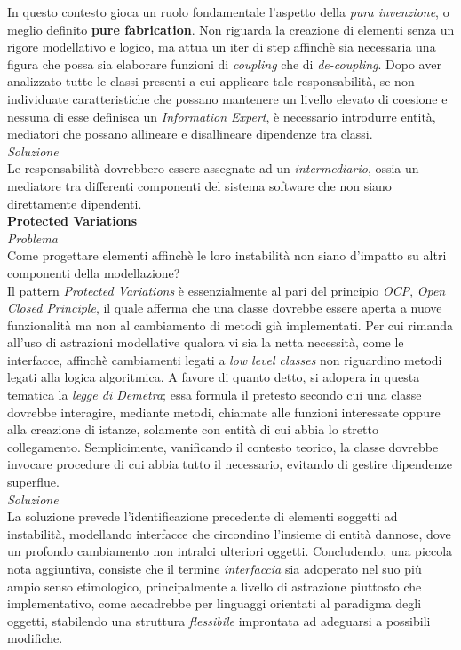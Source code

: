 \documentclass{article}
\begin{document}
In questo contesto gioca un ruolo fondamentale l'aspetto della \textit{pura invenzione}, o meglio definito \textbf{pure fabrication}. Non riguarda la creazione di elementi senza un rigore modellativo e logico, ma attua un iter di step affinchè sia necessaria una figura che possa sia elaborare funzioni di \textit{coupling} che di \textit{de-coupling}. Dopo aver analizzato tutte le classi presenti a cui applicare tale responsabilità, se non individuate caratteristiche che possano mantenere un livello elevato di coesione e nessuna di esse definisca un \textit{Information Expert}, è necessario introdurre entità, mediatori che possano allineare e disallineare dipendenze tra classi.\vspace*{14pt}\\
\textit{Soluzione}\\
Le responsabilità dovrebbero essere assegnate ad un \textit{intermediario}, ossia un mediatore tra differenti componenti del sistema software che non siano direttamente dipendenti.\vspace*{14pt}\\
\textbf{Protected Variations}\vspace*{7pt}\\
\textit{Problema}\\
Come progettare elementi affinchè le loro instabilità non siano d'impatto su altri componenti della modellazione?\vspace*{14pt}\\
Il pattern \textit{Protected Variations} è essenzialmente al pari del principio \textit{OCP}, \textit{Open Closed Principle}, il quale afferma che una classe dovrebbe essere aperta a nuove funzionalità ma non al cambiamento di metodi già implementati. Per cui rimanda all'uso di astrazioni modellative qualora vi sia la netta necessità, come le interfacce, affinchè cambiamenti legati a \textit{low level classes} non riguardino metodi legati alla logica algoritmica. A favore di quanto detto, si adopera in questa tematica la \textit{legge di Demetra}; essa formula il pretesto secondo cui una classe dovrebbe interagire, mediante metodi, chiamate alle funzioni interessate oppure alla creazione di istanze, solamente con entità di cui abbia lo stretto collegamento. Semplicimente, vanificando il contesto teorico, la classe dovrebbe invocare procedure di cui abbia tutto il necessario, evitando di gestire dipendenze superflue.\vspace*{14pt}\\
\textit{Soluzione}\\
La soluzione prevede l'identificazione precedente di elementi soggetti ad instabilità, modellando interfacce che circondino l'insieme di entità dannose, dove un profondo cambiamento non intralci ulteriori oggetti. Concludendo, una piccola nota aggiuntiva, consiste che il termine \textit{interfaccia} sia adoperato nel suo più ampio senso etimologico, principalmente a livello di astrazione piuttosto che implementativo, come accadrebbe per linguaggi orientati al paradigma degli oggetti, stabilendo una struttura \textit{flessibile} improntata ad adeguarsi a possibili modifiche.
\end{document}
